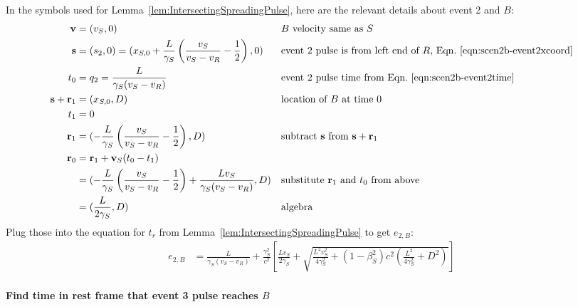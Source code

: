 \documentclass[a4paper]{article}
\theoremstyle{plain}
\theoremstyle{definition}
\newcommand{\vect}[1]{\mathbf{#1}}
\begin{document}
In the symbols used for Lemma~\ref{lem:IntersectingSpreadingPulse},
here are the relevant details about event 2 and $B$:
\begin{align*}
\vect{v} & = (v_S, 0) & & \text{$B$ velocity same as $S$} \\
\vect{s} & = (s_2,0) = (x_{S,0} + \frac{L}{\gamma_S} \left( \frac{v_S}{v_S - v_R} - \frac{1}{2} \right), 0) & & \text{event 2 pulse is from left end of $R$, Eqn.~\eqref{eqn:scen2b-event2xcoord}} \\
t_0 & = q_2 = \frac{L}{\gamma_S(v_S - v_R)} & & \text{event 2 pulse time from Eqn.~\eqref{eqn:scen2b-event2time}} \\
\vect{s} + \vect{r}_1 & = (x_{S,0}, D) & & \text{location of $B$ at time 0} \\
t_1 & = 0 \\
\vect{r}_1 & = (-\frac{L}{\gamma_S} \left( \frac{v_S}{v_S - v_R} - \frac{1}{2} \right), D) & & \text{subtract $\vect{s}$ from $\vect{s}+\vect{r}_1$} \\
\vect{r}_0
  & = \vect{r}_1 + \vect{v}_S(t_0-t_1) \\
  & = (-\frac{L}{\gamma_S} \left( \frac{v_S}{v_S - v_R} - \frac{1}{2} \right) + \frac{Lv_S}{\gamma_S(v_S - v_R)}, D) & & \text{substitute $\vect{r}_1$ and $t_0$ from above} \\
  & = (\frac{L}{2\gamma_S}, D) & & \text{algebra}
\end{align*}
Plug those into the equation for $t_r$ from
Lemma~\ref{lem:IntersectingSpreadingPulse} to get $e_{2,B}$:
\begin{align*}
e_{2,B} & = \frac{L}{\gamma_S(v_S - v_R)} + \frac{\gamma_S^2}{c^2} \left[ \frac{Lv_S}{2\gamma_S} + \sqrt{\frac{L^2v_S^2}{4\gamma_S^2} + (1-\beta_S^2)c^2 (\frac{L^2}{4\gamma_S^2} + D^2)} \right]
\end{align*}


\paragraph{Find time in rest frame that event 3 pulse reaches $B$}
\end{document}
